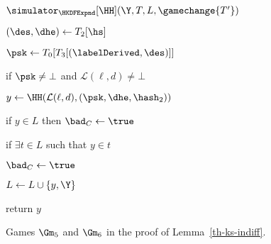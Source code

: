 \begin{figure}[tp]
\begin{minipage}[t]{0.49\textwidth}
\begin{oracle}{$\simulator_{\HKDFExpnd}[\HH](\Y, T, L, \gamechange{T'})$}
	\item \quad {}
	\item \quad $(\des, \dhe) \gets T_2[\hs]$
	\item \quad {}
	\item \quad $\psk \gets T_0[T_3[(\labelDerived, \des)]]$
	\item \quad {}
	\item \quad if $\psk \neq \bot$ and $\mathcal{L}(\ell, d) \neq \bot$ 
	\item \quad \quad $y \gets \HH(\mathcal{L} (\ell, d), (\psk, \dhe,\hash_2))$
	\item \quad {}
	\item \quad \quad {}
	\item \quad \quad {}
	\item if $y \in L$ then $\bad_C \gets \true$
	\item if $\exists t \in L$ such that $y \in t$
	\item \quad $\bad_C \gets \true$
	\item $ L \gets L \cup \{y, \Y\}$
	\item return $y$
\end{oracle}
\end{minipage}
\label{fig:gm56-ks-indiff}
\caption{ Games $\Gm_5$ and $\Gm_6$ in the proof of Lemma~\ref{th-ks-indiff}.}
\end{figure}
